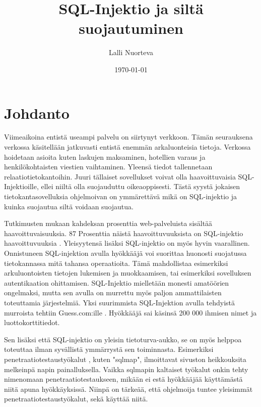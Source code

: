 \documentclass[finnish]{tktltiki2}
\title{SQL-Injektio ja siltä suojautuminen}
\author{Lalli Nuorteva}
\date{\today}
\theoremstyle{definition}
\theoremstyle{remark}
\begin{document}
	
	\frontmatter      %
	
	\maketitle        %
	
	\makeabstract
	
	\tableofcontents  %
	
	
	\mainmatter       %
	
	\section{Johdanto}
	Viimeaikoina entistä useampi palvelu on siirtynyt verkkoon. Tämän seurauksena verkossa käsitellään jatkuvasti entistä enemmän arkaluonteisia tietoja. Verkossa hoidetaan asioita kuten laskujen maksaminen, hotellien varaus ja henkilökohtaisten viestien vaihtaminen. Yleensä tiedot tallennetaan relaatiotietokantoihin. Juuri tällaiset sovellukset voivat olla haavoittuvaisia SQL-Injektioille, ellei niiltä olla suojauduttu oikeaoppisesti. Tästä syystä jokaisen tietokantasovelluksia ohjelmoivan on ymmärettävä mikä on SQL-injektio ja kuinka suojautua siltä voidaan suojautua.
	
	Tutkimusten mukaan kahdeksan prosenttia web-palveluista sisältää haavoittuvaisuuksia.  87 Prosenttia näistä haavoittuvuuksista on SQL-injektio haavoittuvuuksia \cite{detection}. Yleisyytensä lisäksi SQL-injektio on myös hyvin vaarallinen. Onnistuneen SQL-injektion avulla hyökkääjä voi suorittaa huonosti suojatussa tietokannassa mitä tahansa operaatioita. Tämä mahdollistaa esimerkiksi arkuluontoisten tietojen lukemisen ja muokkaamisen, tai esimerkiksi sovelluksen autentikaation ohittamisen. SQL-Injektio mielletään monesti amatöörien ongelmaksi, mutta sen avulla on murrettu myös paljon ammattilaisten toteuttamia järjestelmiä. Yksi suurimmista SQL-Injektion avulla tehdyistä murroista tehtiin Guess.com:ille \cite{guess}. Hyökkääjä sai käsinsä 200 000 ihmisen nimet ja luottokorttitiedot.
	
	Sen lisäksi että SQL-injektio on yleisin tietoturva-aukko, se on myös helppoa toteuttaa ilman syvällistä ymmärrystä sen toiminnasta. Esimerkiksi penetraatiotestaustyökalut , kuten "sqlmap"\space, ilmoittavat sivuston heikkouksita melkeinpä napin painalluksella. Vaikka sqlmapin kaltaiset työkalut onkin tehty nimenomaan penetraatiotestaukseen, mikään ei estä hyökkääjää käyttämästä niitä apuna hyökkäyksissä. Niinpä on tärkeää, että ohjelmoija tuntee yleisimmät penetraatiotestaustyökalut, sekä käyttää niitä.
	
\end{document}
